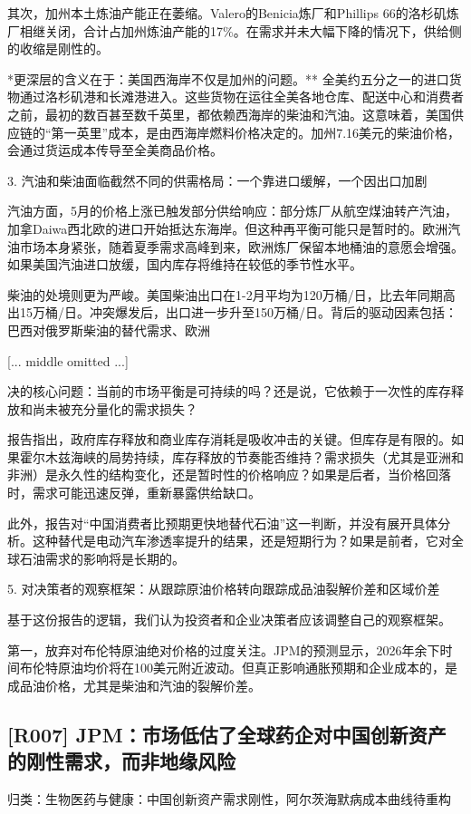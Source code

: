 \documentclass[11pt]{ctexart}
\begin{document}
其次，加州本土炼油产能正在萎缩。Valero的Benicia炼厂和Phillips 66的洛杉矶炼厂相继关闭，合计占加州炼油产能的17\%。在需求并未大幅下降的情况下，供给侧的收缩是刚性的。

*更深层的含义在于：美国西海岸不仅是加州的问题。** 全美约五分之一的进口货物通过洛杉矶港和长滩港进入。这些货物在运往全美各地仓库、配送中心和消费者之前，最初的数百甚至数千英里，都依赖西海岸的柴油和汽油。这意味着，美国供应链的“第一英里”成本，是由西海岸燃料价格决定的。加州7.16美元的柴油价格，会通过货运成本传导至全美商品价格。

3. 汽油和柴油面临截然不同的供需格局：一个靠进口缓解，一个因出口加剧

汽油方面，5月的价格上涨已触发部分供给响应：部分炼厂从航空煤油转产汽油，加拿Daiwa西北欧的进口开始抵达东海岸。但这种再平衡可能只是暂时的。欧洲汽油市场本身紧张，随着夏季需求高峰到来，欧洲炼厂保留本地桶油的意愿会增强。如果美国汽油进口放缓，国内库存将维持在较低的季节性水平。

柴油的处境则更为严峻。美国柴油出口在1-2月平均为120万桶/日，比去年同期高出15万桶/日。冲突爆发后，出口进一步升至150万桶/日。背后的驱动因素包括：巴西对俄罗斯柴油的替代需求、欧洲

[... middle omitted ...]

决的核心问题：当前的市场平衡是可持续的吗？还是说，它依赖于一次性的库存释放和尚未被充分量化的需求损失？

报告指出，政府库存释放和商业库存消耗是吸收冲击的关键。但库存是有限的。如果霍尔木兹海峡的局势持续，库存释放的节奏能否维持？需求损失（尤其是亚洲和非洲）是永久性的结构变化，还是暂时性的价格响应？如果是后者，当价格回落时，需求可能迅速反弹，重新暴露供给缺口。

此外，报告对“中国消费者比预期更快地替代石油”这一判断，并没有展开具体分析。这种替代是电动汽车渗透率提升的结果，还是短期行为？如果是前者，它对全球石油需求的影响将是长期的。

5. 对决策者的观察框架：从跟踪原油价格转向跟踪成品油裂解价差和区域价差

基于这份报告的逻辑，我们认为投资者和企业决策者应该调整自己的观察框架。

第一，放弃对布伦特原油绝对价格的过度关注。JPM的预测显示，2026年余下时间布伦特原油均价将在100美元附近波动。但真正影响通胀预期和企业成本的，是成品油价格，尤其是柴油和汽油的裂解价差。

\subsection{[R007] JPM：市场低估了全球药企对中国创新资产的刚性需求，而非地缘风险}
{\small\color{refgray}归类：生物医药与健康：中国创新资产需求刚性，阿尔茨海默病成本曲线待重构}
\end{document}
